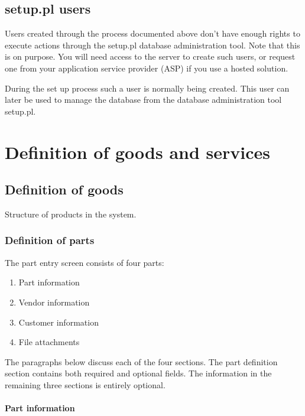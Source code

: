 \section{setup.pl users}

Users created through the process documented above don't have enough rights to
execute actions through the setup.pl database administration tool. Note that this
is on purpose. You will need access to the server to create such users, or request
one from your application service provider (ASP) if you use a hosted solution.

During the set up process such a user is normally being created. This user can later
be used to manage the database from the database administration tool setup.pl.


\chapter{Definition of goods and services}
\label{cha:ProductsDefinition}


\section{Definition of goods}
Structure of products in the system.

\subsection{Definition of parts}
\label{sec:DefinitionOfParts}

The part entry screen consists of four parts:

\begin{enumerate}
\item Part information
\item Vendor information
\item Customer information
\item File attachments
\end{enumerate}


The paragraphs below discuss each of the four sections. The part definition section
contains both required and optional fields. The information in the remaining
three sections is entirely optional.

\subsubsection{Part information}
\label{subsec:PartInformation}

